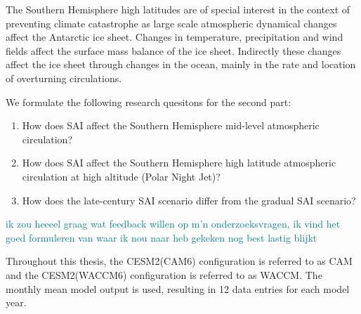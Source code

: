 The Southern Hemisphere high latitudes are of special interest in the context of preventing climate catastrophe as large scale atmospheric dynamical changes affect the Antarctic ice sheet. Changes in temperature, precipitation and wind fields affect the surface mass balance of the ice sheet. Indirectly these changes affect the ice sheet through changes in the ocean, mainly in the rate and location of overturning circulations. %

We formulate the following research quesitons for the second part:

\begin{enumerate}
    \item How does SAI affect the Southern Hemisphere mid-level atmospheric circulation?
    \item How does SAI affect the Southern Hemisphere high latitude atmospheric circulation at high altitude (Polar Night Jet)?
    \item How does the late-century SAI scenario differ from the gradual SAI scenario?
\end{enumerate}

\textcolor{teal}{ik zou heeeel graag wat feedback willen op m'n onderzoeksvragen, ik vind het goed formuleren van waar ik nou naar heb gekeken nog best lastig blijkt}

Throughout this thesis, the CESM2(CAM6) configuration is referred to as CAM and the CESM2(WACCM6) configuration is referred to as WACCM. The monthly mean model output is used, resulting in 12 data entries for each model year. 